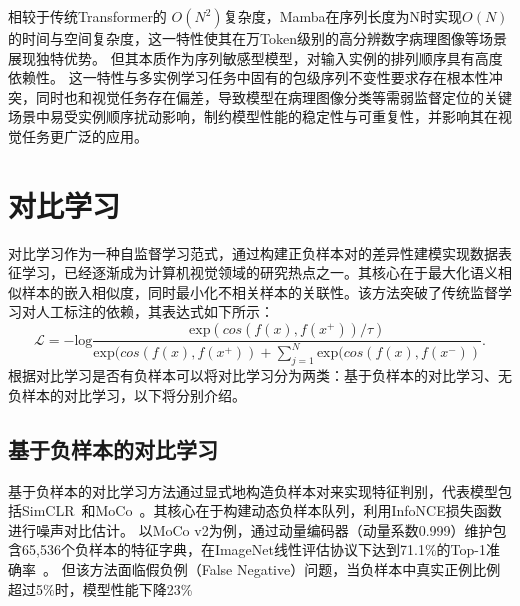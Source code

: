 相较于传统Transformer的 $O(N^2)$复杂度，Mamba在序列长度为N时实现$O(N)$ 的时间与空间复杂度，这一特性使其在万Token级别的高分辨数字病理图像等场景展现独特优势。
但其本质作为序列敏感型模型，对输入实例的排列顺序具有高度依赖性。
这一特性与多实例学习任务中固有的包级序列不变性要求存在根本性冲突，同时也和视觉任务存在偏差，导致模型在病理图像分类等需弱监督定位的关键场景中易受实例顺序扰动影响，制约模型性能的稳定性与可重复性，并影响其在视觉任务更广泛的应用。


\section[\hspace{-2pt}对比学习]{{\heiti{} \hspace{-8pt}对比学习}}\label{section2: 对比学习}

对比学习作为一种自监督学习范式，通过构建正负样本对的差异性建模实现数据表征学习，已经逐渐成为计算机视觉领域的研究热点之一。其核心在于最大化语义相似样本的嵌入相似度，同时最小化不相关样本的关联性。该方法突破了传统监督学习对人工标注的依赖，其表达式如下所示：
\begin{equation}
\label{equation2: infoNCE}
\mathcal{L} = - \text{log}\frac{\text{exp}(cos(f(x), f(x^+)) / \tau)}{\text{exp}(cos(f(x), f(x^+)) + \sum_{j=1}^{N} \text{exp}(cos(f(x), f(x^-))}.
\end{equation}
根据对比学习是否有负样本可以将对比学习分为两类：基于负样本的对比学习、无负样本的对比学习，以下将分别介绍。

\subsection[\hspace{-2pt}基于负样本的对比学习]{{\heiti{} \hspace{-8pt}基于负样本的对比学习}}\label{section2: 基于负样本的对比学习}

基于负样本的对比学习方法通过显式地构造负样本对来实现特征判别，代表模型包括SimCLR~\cite{chen2020simple}和MoCo~\cite{he2020momentum}。其核心在于构建动态负样本队列，利用InfoNCE损失函数进行噪声对比估计。
以MoCo v2为例，通过动量编码器（动量系数0.999）维护包含65,536个负样本的特征字典，在ImageNet线性评估协议下达到71.1\%的Top-1准确率~\cite{chen2020improved}。
但该方法面临假负例（False Negative）问题，当负样本中真实正例比例超过5\%时，模型性能下降23\%~\cite{chen2021incremental}

